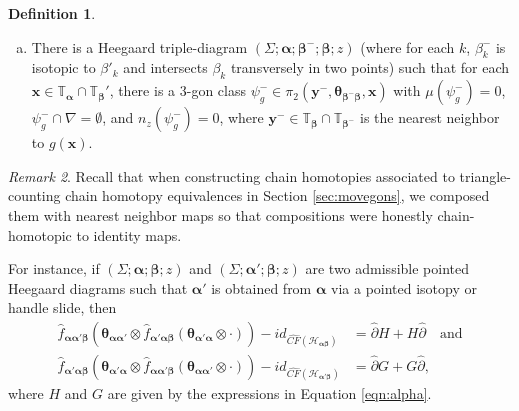 \documentclass[11pt]{article}
\theoremstyle{plain} \newtheorem{thm}{Theorem}[subsection]
\theoremstyle{plain} \newtheorem{cor}[thm]{Corollary}
\theoremstyle{plain} \newtheorem{prop}[thm]{Proposition}
\theoremstyle{plain} \newtheorem{conj}[thm]{Conjecture}
\theoremstyle{plain} \newtheorem{lem}[thm]{Lemma}
\theoremstyle{definition} \newtheorem{df}[thm]{Definition}
\theoremstyle{remark} \newtheorem{rmk}[thm]{Remark}
\theoremstyle{remark} \newtheorem{obs}[thm]{Observation}
\newcommand{\h}{\mathcal{H}}
\newcommand{\del}{\partial}
\newcommand{\delh}{\widehat{\del}}
\newcommand{\ba}{\boldsymbol{\alpha}}
\newcommand{\bb}{\boldsymbol{\beta}}
\newcommand{\Ta}{\mathbb{T}_{\ba}}
\newcommand{\Tb}{\mathbb{T}_{\bb}}
\newcommand{\bx}{\mathbf{x}}
\newcommand{\by}{\mathbf{y}}
\newcommand{\thet}[1]{\boldsymbol{\theta}_{#1}}
\newcommand{\tor}[1]{\mathbb{T}_{#1}}
\newcommand{\AD}{\nabla}
\begin{document}
\begin{df}
\begin{enumerate}[(i)]
\begin{enumerate}[(a)]
\item There is a Heegaard triple-diagram $\left(\Sigma; \ba; \bb^{-}; \bb; z\right)$ (where for each $k$, $\beta_{k}^{-}$ is isotopic to $\beta'_{k}$ and intersects $\beta_{k}$ transversely in two points) such that for each $\bx \in \Ta \cap \Tb'$, there is a 3-gon class $\psi_{g}^{-} \in \pi_{2}(\by^{-}, \thet{\bb^{-}\bb}, \bx)$ with $\mu(\psi_{g}^{-}) = 0$, $\psi_{g}^{-} \cap \AD = \emptyset$, and $n_{z}(\psi_{g}^{-}) = 0$, where $\by^{-} \in \Tb \cap \tor{\bb^{-}}$ is the nearest neighbor to $g(\bx)$.
\end{enumerate}
\end{enumerate}
\end{df}


%

\begin{rmk}\label{rmk:nn}
Recall that when constructing chain homotopies associated to triangle-counting chain homotopy equivalences in Section \ref{sec:movegons}, we composed them with nearest neighbor maps so that compositions were honestly chain-homotopic to identity maps.

For instance, if $\left( \Sigma; \ba; \bb; z \right)$ and $\left( \Sigma; \ba'; \bb; z \right)$ are two admissible pointed Heegaard diagrams such that $\ba'$ is obtained from $\ba$ via a pointed isotopy or handle slide, then
\begin{align*}
\widehat{f}_{\ba\ba'\bb} \left( \thet{\ba\ba'} \otimes \widehat{f}_{\ba'\ba\bb} \left(  \thet{\ba'\ba}  \otimes \cdot \right) \right)  - id_{\widehat{CF}(\h_{\ba\bb})} &= \delh H + H\delh \quad \text{and}\\
\widehat{f}_{\ba'\ba\bb} \left( \thet{\ba' \ba} \otimes \widehat{f}_{\ba\ba'\bb} \left( \thet{\ba\ba'} \otimes \cdot \right) \right) - id_{\widehat{CF}(\h_{\ba'\bb})} &= \delh G + G\delh,
\end{align*}
where $H$ and $G$ are given by the expressions in Equation \ref{eqn:alpha}.
\end{rmk}
\end{document}
